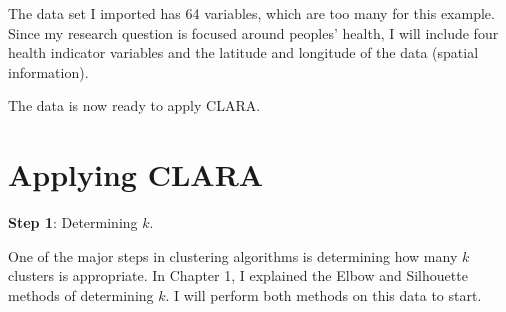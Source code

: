 \documentclass[12pt,twoside]{amherstthesis}
\begin{document}
  The data set I imported has 64 variables, which are too many for this
  example. Since my research question is focused around peoples' health, I
  will include four health indicator variables and the latitude and
  longitude of the data (spatial information).
  
  \begin{Shaded}
  \begin{Highlighting}[]
  \StringTok{ }\NormalTok{(}\NormalTok{, }\NormalTok{, }\NormalTok{, }
              \NormalTok{, }\NormalTok{, }\NormalTok{)}
  \StringTok{ }
  \end{Highlighting}
  \end{Shaded}
  
  The data is now ready to apply CLARA.
  
  \section{Applying CLARA}\label{applying-clara}
  
  \textbf{Step 1}: Determining \(k\).
  
  One of the major steps in clustering algorithms is determining how many
  \(k\) clusters is appropriate. In Chapter 1, I explained the Elbow and
  Silhouette methods of determining \(k\). I will perform both methods on
  this data to start.
  
  \begin{Shaded}
  \begin{Highlighting}[]
  \StringTok{ }
  
  \StringTok{ } \NormalTok{) }\OperatorTok{+}
  \StringTok{    }\NormalTok{(} \NormalTok{, } \NormalTok{)}\OperatorTok{+}
  \StringTok{  }\NormalTok{(} 
  \end{Highlighting}
  \end{Shaded}
  
\end{document}
